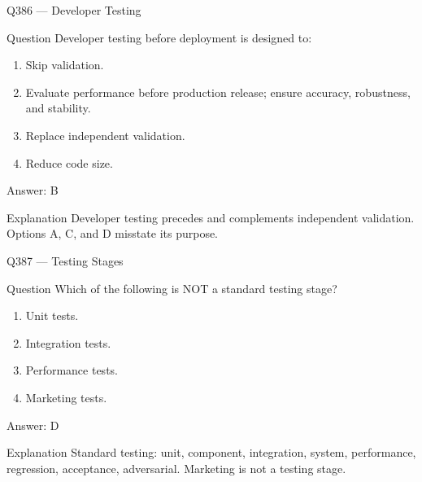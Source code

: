 \documentclass[aspectratio=169,8pt]{beamer}
\begin{document}
	\begin{frame}{Q386 --- Developer Testing}
		\begin{block}{Question}
			Developer testing before deployment is designed to:
			\begin{enumerate}
				\item Skip validation.
				\item Evaluate performance before production release; ensure accuracy, robustness, and stability.
				\item Replace independent validation.
				\item Reduce code size.
			\end{enumerate}
		\end{block}
		\begin{exampleblock}{Answer: B}\end{exampleblock}
		\begin{block}{Explanation}
			Developer testing precedes and complements independent validation. Options A, C, and D misstate its purpose.
		\end{block}
	\end{frame}
	
	\begin{frame}{Q387 --- Testing Stages}
		\begin{block}{Question}
			Which of the following is NOT a standard testing stage?
			\begin{enumerate}
				\item Unit tests.
				\item Integration tests.
				\item Performance tests.
				\item Marketing tests.
			\end{enumerate}
		\end{block}
		\begin{exampleblock}{Answer: D}\end{exampleblock}
		\begin{block}{Explanation}
			Standard testing: unit, component, integration, system, performance, regression, acceptance, adversarial. Marketing is not a testing stage.
		\end{block}
	\end{frame}
	
\end{document}
